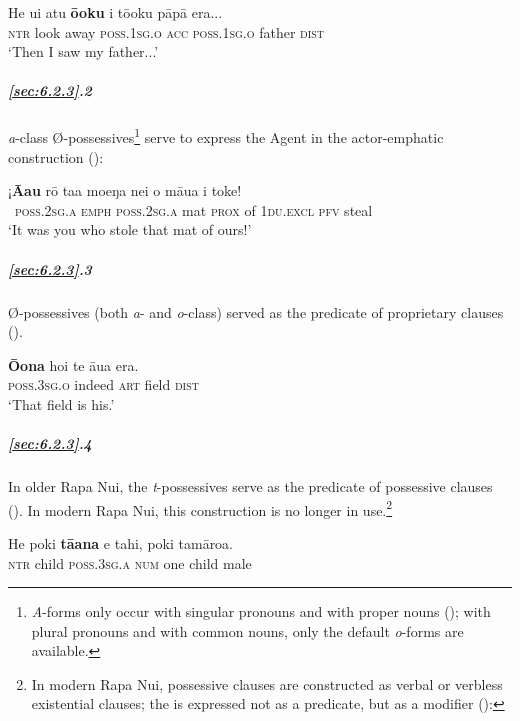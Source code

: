 \ea\label{ex:6.27}
\gll He u{\ꞌ}i atu \textbf{ō{\ꞌ}oku} i tō{\ꞌ}oku pāpā era...\\
\textsc{ntr} look away \textsc{poss.1sg.o} \textsc{acc} \textsc{poss.1sg.o} father \textsc{dist}\\

\glt 
‘Then I saw my father...’ \textstyleExampleref{[R101.012]} 
\z

\subparagraph{\ref{sec:6.2.3}.2} \textit{a}{}-class Ø-possessives\footnote{\label{fn:288}\textit{A}-forms only occur with singular pronouns and with proper nouns (); with plural pronouns and with common nouns, only the default \textit{o}{}-forms are available.} serve to express the Agent in the actor-emphatic construction ():

\ea\label{ex:6.28}
\gll ¡\textbf{{\ꞌ}Ā{\ꞌ}au} rō ta{\ꞌ}a moeŋa nei o māua i toke! \\
~\textsc{poss.2sg.a} \textsc{emph} \textsc{poss.2sg.a} mat \textsc{prox} of \textsc{1du.excl} \textsc{pfv} steal \\

\glt 
‘It was you who stole that mat of ours!’ \textstyleExampleref{[R310.428]} 
\z

\subparagraph{\ref{sec:6.2.3}.3} Ø-possessives (both \textit{a}{}- and \textit{o}{}-class) served as the predicate of proprietary clauses ().

\ea\label{ex:6.29}
\gll \textbf{Ō{\ꞌ}ona} ho{\ꞌ}i te {\ꞌ}āua era. \\
\textsc{poss.3sg.o} indeed \textsc{art} field \textsc{dist} \\

\glt 
‘That field is his.’ \textstyleExampleref{[R413.228]} 
\z

\subparagraph{\ref{sec:6.2.3}.4} In older Rapa Nui, the \textit{t}{}-possessives serve as the predicate of possessive clauses (). In modern Rapa Nui, this construction is no longer in use.\footnote{\label{fn:289}In modern Rapa Nui, possessive clauses are constructed as verbal or verbless existential clauses; the  is expressed not as a predicate, but as a  modifier ():}

\ea\label{ex:6.30}
\gll He poki \textbf{tā{\ꞌ}ana} e tahi, poki tamāroa. \\
\textsc{ntr} child \textsc{poss.3sg.a} \textsc{num} one child male \\

